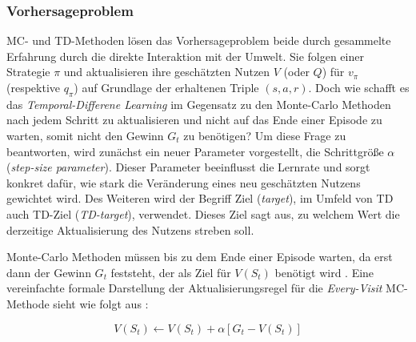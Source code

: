 \subsubsection{Vorhersageproblem}
MC- und TD-Methoden lösen das Vorhersageproblem beide durch gesammelte Erfahrung durch die direkte Interaktion mit der Umwelt. Sie folgen einer Strategie $\pi$ und aktualisieren ihre geschätzten Nutzen $V$ (oder $Q$) für $v_\pi$ (respektive $q_\pi$) auf Grundlage der erhaltenen Triple $(s,a,r)$. Doch wie schafft es das \textit{Temporal-Differene Learning} im Gegensatz zu den Monte-Carlo Methoden nach jedem Schritt zu aktualisieren und nicht auf das Ende einer Episode zu warten, somit nicht den Gewinn $G_t$ zu benötigen?
\newpage 
Um diese Frage zu beantworten, wird zunächst ein neuer Parameter vorgestellt, die Schrittgröße $\alpha$ (\textit{step-size parameter}). Dieser Parameter beeinflusst die Lernrate und sorgt konkret dafür, wie stark die Veränderung eines neu geschätzten Nutzens gewichtet wird. Des Weiteren wird der Begriff \glqq Ziel\grqq{} (\textit{target}), im Umfeld von TD auch TD-Ziel (\textit{TD-target}), verwendet. Dieses Ziel sagt aus, zu welchem Wert die derzeitige Aktualisierung des Nutzens streben soll.
\par 
Monte-Carlo Methoden müssen bis zu dem Ende einer Episode warten, da erst dann der Gewinn $G_t$ feststeht, der als Ziel für $V(S_t)$ benötigt wird \cite[S.~119]{Sutton1998}. Eine vereinfachte formale Darstellung der Aktualisierungsregel für die \textit{Every-Visit} MC-Methode sieht wie folgt aus \cite[S.~119]{Sutton1998}:

\begin{equation}
    V(S_t) \gets V(S_t) + \alpha \left[G_t - V(S_t)\right]
\end{equation}

